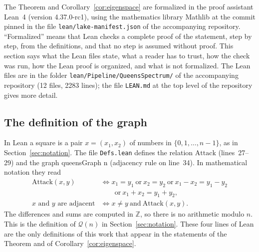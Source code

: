 \documentclass[11pt]{amsart}
\theoremstyle{plain}
\theoremstyle{definition}
\theoremstyle{remark}
\numberwithin{equation}{section}
\newcommand{\QG}{\mathcal{Q}}          %
\newcommand{\Z}{\mathbb{Z}}
\newcommand{\leanus}{\textunderscore\allowbreak}
\newcommand{\lean}[1]{{\ttfamily\let\_\leanus #1}}  %
\begin{document}
The Theorem and Corollary~\ref{cor:eigenspace} are formalized in the proof assistant
Lean~4 (version 4.37.0-rc1), using the
mathematics library Mathlib at the commit pinned in the file
\nolinkurl{lean/lake-manifest.json} of the accompanying repository. ``Formalized'' means
that Lean checks a complete proof of the statement, step by step, from the definitions,
and that no step is assumed without proof. This section says what the Lean files state,
what a reader has to trust, how the check was run, how the Lean proof is organized, and
what is not formalized. The Lean files are in the folder
\nolinkurl{lean/Pipeline/QueensSpectrum/} of the accompanying repository (12 files,
2283 lines); the file \nolinkurl{LEAN.md} at the top level of the repository gives more
detail.

\subsection{The definition of the graph}
In Lean a square is a pair \(x=(x_1,x_2)\) of numbers in \(\{0,1,\dots,n-1\}\), as in
Section~\ref{sec:notation}. The file \nolinkurl{Defs.lean} defines the relation
\(\mathrm{Attack}\) (lines~27--29) and the graph \lean{queensGraph n} (adjacency
rule on line~34). In mathematical notation they read
\begin{align*}
\mathrm{Attack}(x,y)&\iff x_1=y_1\ \text{or}\ x_2=y_2\ \text{or}\ x_1-x_2=y_1-y_2\\
&\qquad\text{or}\ x_1+x_2=y_1+y_2,\\
x\text{ and }y\text{ are adjacent}&\iff x\ne y\ \text{and}\ \mathrm{Attack}(x,y).
\end{align*}
The differences and sums are computed in \(\Z\), so there is no arithmetic modulo \(n\).
This is the definition of \(\QG(n)\) in Section~\ref{sec:notation}. These four lines of
Lean are the only definitions of this work that appear in the statements of the Theorem
and of Corollary~\ref{cor:eigenspace}.
\end{document}
